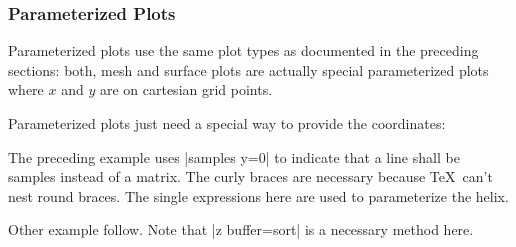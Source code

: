 \subsubsection{Parameterized Plots}
Parameterized plots use the same plot types as documented in the preceding sections: both, mesh and surface plots are actually special parameterized plots where $x$ and $y$ are on cartesian grid points.

Parameterized plots just need a special way to provide the coordinates:

\pgfplotsexpensiveexample
\begin{codeexample}[]
\end{codeexample}
\noindent The preceding example uses |samples y=0| to indicate that a line shall be samples instead of a matrix. The curly braces are necessary because \TeX\ can't nest round braces. The single expressions here are used to parameterize the helix.

Other example follow. Note that |z buffer=sort| is a necessary method here.

\pgfplotsexpensiveexample
\begin{codeexample}[]
\end{codeexample}

\pgfplotsexpensiveexample
\begin{codeexample}[]
\end{codeexample}

